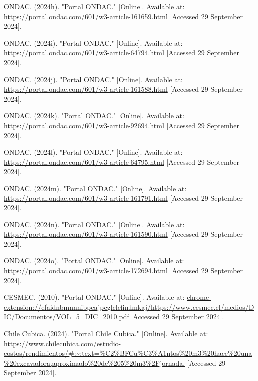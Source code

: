 \documentclass{article} %
\begin{document}
\begin{thebibliography}{}
    ONDAC. (2024h). "Portal ONDAC." [Online]. Available at: \url{https://portal.ondac.com/601/w3-article-161659.html} [Accessed 29 September 2024].
    
    ONDAC. (2024i). "Portal ONDAC." [Online]. Available at: \url{https://portal.ondac.com/601/w3-article-64794.html} [Accessed 29 September 2024].
    
    ONDAC. (2024j). "Portal ONDAC." [Online]. Available at: \url{https://portal.ondac.com/601/w3-article-161588.html} [Accessed 29 September 2024].
    
    ONDAC. (2024k). "Portal ONDAC." [Online]. Available at: \url{https://portal.ondac.com/601/w3-article-92694.html} [Accessed 29 September 2024].
    
    ONDAC. (2024l). "Portal ONDAC." [Online]. Available at: \url{https://portal.ondac.com/601/w3-article-64795.html} [Accessed 29 September 2024].
    
    ONDAC. (2024m). "Portal ONDAC." [Online]. Available at: \url{https://portal.ondac.com/601/w3-article-161791.html} [Accessed 29 September 2024].
    
    ONDAC. (2024n). "Portal ONDAC." [Online]. Available at: \url{https://portal.ondac.com/601/w3-article-161590.html} [Accessed 29 September 2024].
    
    ONDAC. (2024o). "Portal ONDAC." [Online]. Available at: \url{https://portal.ondac.com/601/w3-article-172694.html} [Accessed 29 September 2024].
    
    CESMEC. (2010). "Portal ONDAC." [Online]. Available at: \url{chrome-extension://efaidnbmnnnibpcajpcglclefindmkaj/https://www.cesmec.cl/medios/DIC/Documentos/VOL_5_DIC_2010.pdf} [Accessed 29 September 2024].
    
    Chile Cubica. (2024). "Portal Chile Cubica." [Online]. Available at: \url{https://www.chilecubica.com/estudio-costos/rendimientos/#:~:text=%C2%BFCu%C3%A1ntos%20m3%20hace%20una%20excavadora,aproximado%20de%205%20m3%2Fjornada.} [Accessed 29 September 2024].
    

\end{thebibliography}
\end{document}
